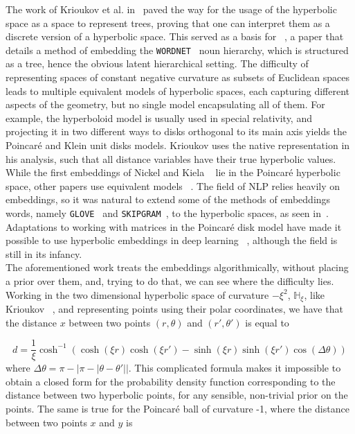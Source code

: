 \documentclass[12pt]{report}
\newcommand{\mb}[1]{\mathbb{#1}}
\begin{document}
The work of Krioukov et al. in~\parencite{krioukov} paved the way for the usage of the hyperbolic space as a space to represent trees, proving that one can interpret them as a discrete version of a hyperbolic space. This served as a basis for ~\parencite{poincare}, a paper that details a method of embedding the \texttt{WORDNET}~\parencite{wordnet} noun hierarchy, which is structured as a tree, hence the obvious latent hierarchical setting. The difficulty of representing spaces of constant negative curvature as subsets of Euclidean spaces leads to multiple equivalent models of hyperbolic spaces, each capturing different aspects of the geometry, but no single model encapsulating all of them. For example, the hyperboloid model is usually used in special relativity, and projecting it in two different ways to disks orthogonal to its main axis yields the Poincar\'{e} and Klein unit disks models. Krioukov uses the native representation in his analysis, such that all distance variables have their true hyperbolic values. While the first embeddings of Nickel and Kiela ~\parencite{poincare} lie in the Poincar\'{e} hyperbolic space, other papers use equivalent models ~\parencite{skipgram, lorentz}. The field of NLP relies heavily on embeddings, so it was natural to extend some of the methods of embeddings words, namely \texttt{GLOVE}~\parencite{glove} and \texttt{SKIPGRAM}~\parencite{word2vec}, to the hyperbolic spaces, as seen in~\parencite{skipgram, poincareglove}. Adaptations to working with matrices in the Poincar\'{e} disk model have made it possible to use hyperbolic embeddings in deep learning ~\parencite{hnn, ahnn}, although the field is still in its infancy. \\

The aforementioned work treats the embeddings algorithmically, without placing a prior over them, and, trying to do that, we can see where the difficulty lies. Working in the two dimensional hyperbolic space of curvature $-\xi^2$, $\mb{H}_\xi$, like Krioukov ~\parencite{krioukov}, and representing points using their polar coordinates, we have that the distance $x$ between two points $(r, \theta)$ and $(r', \theta')$ is equal to

\begin{equation}
    d = \frac{1}{\xi}\cosh^{-1}(\cosh(\xi r)\cosh(\xi r') - \sinh(\xi r)\sinh(\xi r')\cos(\Delta\theta))
\end{equation}
where $\Delta\theta = \pi - |\pi - |\theta - \theta'||$. This complicated formula makes it impossible to obtain a closed form for the probability density function corresponding to the distance between two hyperbolic points, for any sensible, non-trivial prior on the points. The same is true for the Poincar\'{e} ball of curvature -1, where the distance between two points $x$ and $y$ is
\end{document}
